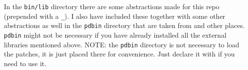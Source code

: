 In the \texttt{bin/lib} directory there are some abstractions made for this repo (prepended with a \texttt{\_}). I also have included these together with some other abstractions as well in the \texttt{pdbin} directory that are taken from  and other places. \texttt{pdbin} might not be necessary if you have already installed all the external libraries mentioned above. NOTE: the \texttt{pdbin} directory is not necessary to load the patches, it is just placed there for convenience. Just declare it with  if you need to use it.








    
    
    
    
    


